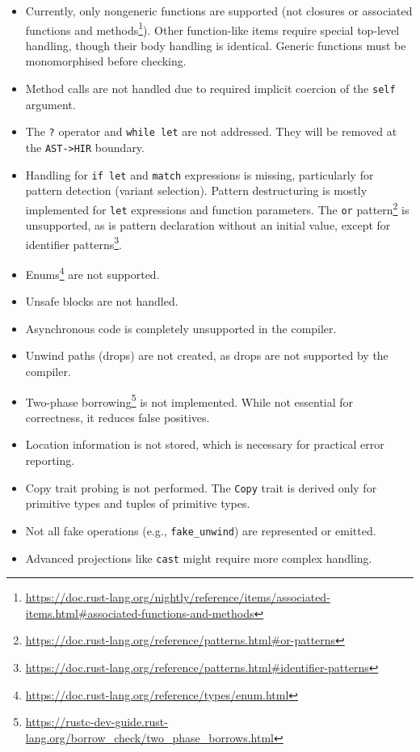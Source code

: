 \documentclass[
  11pt,
  twoside,symmetric]{report}
\providecommand{\tightlist}{%
  \setlength{\itemsep}{0pt}\setlength{\parskip}{0pt}}
\DeclareRobustCommand{\href}[2]{#2\footnote{\url{#1}}}
\begin{document}
\begin{itemize}
\tightlist
\item
  Currently, only nongeneric functions are supported (not closures or
  \href{https://doc.rust-lang.org/nightly/reference/items/associated-items.html\#associated-functions-and-methods}{associated
  functions and methods}). Other function-like items require special
  top-level handling, though their body handling is identical. Generic
  functions must be monomorphised before checking.
\item
  Method calls are not handled due to required implicit coercion of the
  \texttt{self} argument.
\item
  The \texttt{?} operator and \texttt{while\ let} are not addressed.
  They will be removed at the \texttt{AST-\textgreater{}HIR} boundary.
\item
  Handling for \texttt{if\ let} and \texttt{match} expressions is
  missing, particularly for pattern detection (variant selection).
  Pattern destructuring is mostly implemented for \texttt{let}
  expressions and function parameters. The
  \href{https://doc.rust-lang.org/reference/patterns.html\#or-patterns}{\texttt{or}
  pattern} is unsupported, as is pattern declaration without an initial
  value, except for
  \href{https://doc.rust-lang.org/reference/patterns.html\#identifier-patterns}{identifier
  patterns}.
\item
  \href{https://doc.rust-lang.org/reference/types/enum.html}{Enums} are
  not supported.
\item
  Unsafe blocks are not handled.
\item
  Asynchronous code is completely unsupported in the compiler.
\item
  Unwind paths (drops) are not created, as drops are not supported by
  the compiler.
\item
  \href{https://rustc-dev-guide.rust-lang.org/borrow_check/two_phase_borrows.html}{Two-phase
  borrowing} is not implemented. While not essential for correctness, it
  reduces false positives.
\item
  Location information is not stored, which is necessary for practical
  error reporting.
\item
  Copy trait probing is not performed. The \texttt{Copy} trait is
  derived only for primitive types and tuples of primitive types.
\item
  Not all fake operations (e.g., \texttt{fake\_unwind}) are represented
  or emitted.
\item
  Advanced projections like \texttt{cast} might require more complex
  handling.
\end{itemize}
\end{document}
